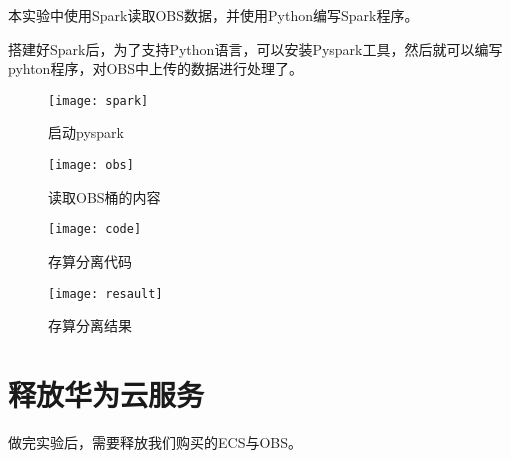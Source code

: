 \documentclass{../source/Experiment}
\begin{document}
        本实验中使用Spark读取OBS数据，并使用Python编写Spark程序。

        搭建好Spark后，为了支持Python语言，可以安装Pyspark工具，然后就可以编写pyhton程序，对OBS中上传的数据进行处理了。
        \begin{figure}[H]
            \centering
            \texttt{[image: spark]}
            \caption{启动pyspark}
        \end{figure}

        \begin{figure}[H]
            \centering
            \texttt{[image: obs]}
            \caption{读取OBS桶的内容}
        \end{figure}

        \begin{figure}[H]
            \centering
            \texttt{[image: code]}
            \caption{存算分离代码}
        \end{figure}

        \begin{figure}[H]
            \centering
            \texttt{[image: resault]}
            \caption{存算分离结果}
        \end{figure}
    \section{释放华为云服务}
        做完实验后，需要释放我们购买的ECS与OBS。
\end{document}
